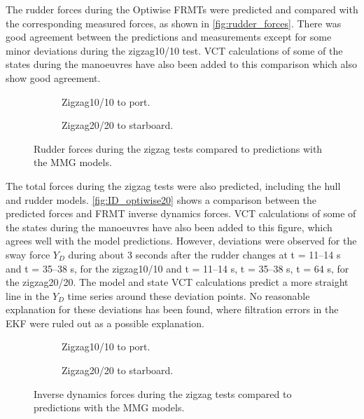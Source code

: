 The rudder forces during the Optiwise FRMTs were predicted and compared with the corresponding measured forces, as shown in \autoref{fig:rudder_forces}. There was good agreement between the predictions and measurements except for some minor deviations during the zigzag10/10 test. VCT calculations of some of the states during the manoeuvres have also been added to this comparison which also show good agreement.
\begin{figure}[h]
    \centering
    \begin{subfigure}[b]{\textwidth}
        \centering
        
        \caption{Zigzag10/10 to port.}
        \label{fig:ID_measured_rudder_zigzag_10_10}
    \end{subfigure}
     \vfill
    \begin{subfigure}[b]{\textwidth}
        \centering
        
        \caption{Zigzag20/20 to starboard.}
        \label{fig:ID_measured_rudder_zigzag_20_20}
    \end{subfigure}
    \caption{Rudder forces during the zigzag tests compared to predictions with the MMG models.}
    \label{fig:rudder_forces}
\end{figure}

The total forces during the zigzag tests were also predicted, including the hull and rudder models. \autoref{fig:ID_optiwise20}  shows a comparison between the predicted forces and FRMT inverse dynamics forces. VCT calculations of some of the states during the manoeuvres have also been added to this figure, which agrees well with the model predictions.
However, deviations were observed for the sway force $Y_D$ during about 3 seconds after the rudder changes at t = 11--14 s and t = 35--38 s, for the zigzag10/10 and t = 11--14 s, t = 35--38 s, t = 64 s, for the zigzag20/20. The model and state VCT calculations predict a more straight line in the $Y_D$ time series around these deviation points. No reasonable explanation for these deviations has been found, where filtration errors in the EKF were ruled out as a possible explanation.
\begin{figure}[h]
    \centering
    \begin{subfigure}[b]{\textwidth}
        \centering
        
        \caption{Zigzag10/10 to port.}
        \label{fig:ID_MMG_zigzag_10_10}
    \end{subfigure}
     \vfill
    \begin{subfigure}[b]{\textwidth}
        \centering
        
        \caption{Zigzag20/20 to starboard.}
        \label{fig:ID_MMG_zigzag_20_20}
    \end{subfigure}
    \caption{Inverse dynamics forces during the zigzag tests compared to predictions with the MMG models.}
    \label{fig:ID_optiwise20}
\end{figure}

